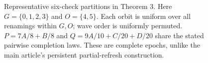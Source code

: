 \begin{figure}[htbp]\centering
{}
\caption{Representative six-check partitions in Theorem 3. Here
$G=\{0,1,2,3\}$ and $O=\{4,5\}$. Each orbit is uniform over all
renamings within $G,O$; wave order is uniformly permuted.
$P=7A/8+B/8$ and $Q=9A/10+C/20+D/20$ share the stated pairwise
completion laws. These are complete epochs, unlike the main article's
persistent partial-refresh construction.}
\label{fig:s-wave-partitions}
\end{figure}
